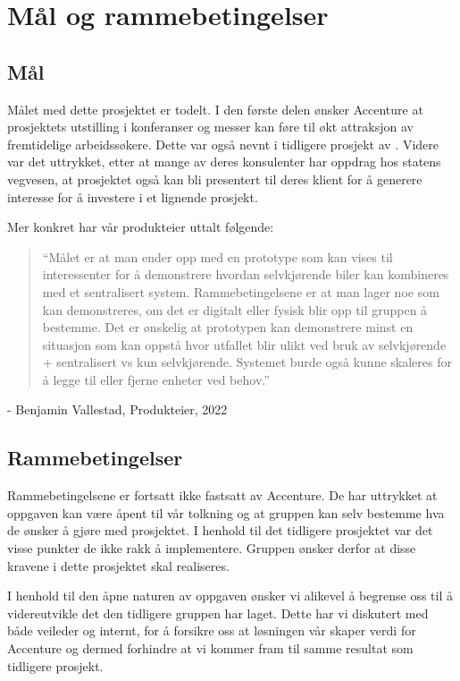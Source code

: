 \chapter{Mål og rammebetingelser}
\section{Mål}
Målet med dette prosjektet er todelt. I den første delen ønsker Accenture at prosjektets utstilling i konferanser og messer kan føre til økt attraksjon av fremtidelige arbeidssøkere. Dette var også nevnt i tidligere prosjekt av \cite{bachelor2020}. Videre var det uttrykket, etter at mange av deres konsulenter har oppdrag hos statens vegvesen, at prosjektet også kan bli presentert til deres klient for å generere interesse for å investere i et lignende prosjekt.

Mer konkret har vår produkteier uttalt følgende:
\begin{quotation}
    ``Målet er at man ender opp med en prototype som kan vises til interessenter for å demonstrere hvordan selvkjørende biler kan kombineres med et sentralisert system.
    Rammebetingelsene er at man lager noe som kan demonstreres, om det er digitalt eller fysisk blir opp til gruppen å bestemme. Det er ønskelig at prototypen kan demonstrere minst en situasjon som kan oppstå hvor utfallet blir ulikt ved bruk av selvkjørende + sentralisert vs kun selvkjørende. Systemet burde også kunne skaleres for å legge til eller fjerne enheter ved behov.''
\end{quotation}
\begin{flushright}
    - Benjamin Vallestad, Produkteier, 2022
\end{flushright}

\section{Rammebetingelser}
Rammebetingelsene er fortsatt ikke fastsatt av Accenture. De har uttrykket at oppgaven kan være åpent til vår tolkning og at gruppen kan selv bestemme hva de ønsker å gjøre med prosjektet. I henhold til det tidligere prosjektet var det visse punkter de ikke rakk å implementere. Gruppen ønsker derfor at disse kravene i dette prosjektet skal realiseres.

I henhold til den åpne naturen av oppgaven ønsker vi alikevel å begrense oss til å videreutvikle det den tidligere gruppen har laget. Dette har vi diskutert med både veileder og internt, for å forsikre oss at løsningen vår skaper verdi for Accenture og dermed forhindre at vi kommer fram til samme resultat som tidligere prosjekt.

